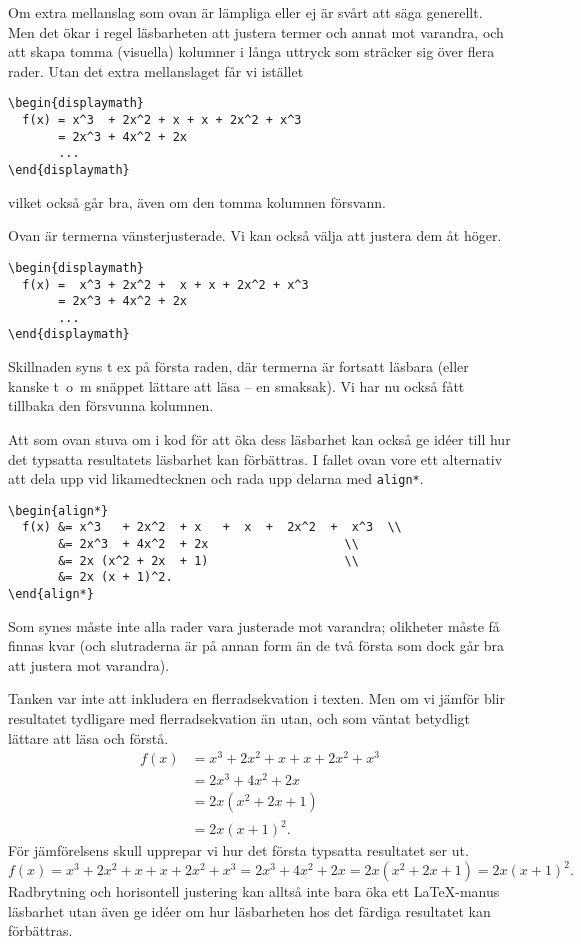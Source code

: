 \documentclass[a4paper,12pt]{article}
\begin{document}
Om extra mellanslag som ovan är lämpliga eller ej är svårt att säga
generellt. Men det ökar i regel läsbarheten att justera termer och
annat mot varandra, och att skapa tomma (visuella) 
kolumner i långa uttryck som sträcker sig över flera rader. Utan det
extra mellanslaget får vi istället 
%
\begin{lstlisting}
\begin{displaymath}
  f(x) = x^3  + 2x^2 + x + x + 2x^2 + x^3
       = 2x^3 + 4x^2 + 2x
       ...
\end{displaymath}
\end{lstlisting}
%
vilket också går bra, även om den tomma kolumnen försvann. 


Ovan är termerna vänsterjusterade. Vi kan också välja att justera dem
åt höger. 
\begin{lstlisting}
\begin{displaymath}
  f(x) =  x^3 + 2x^2 +  x + x + 2x^2 + x^3
       = 2x^3 + 4x^2 + 2x
       ...
\end{displaymath}
\end{lstlisting}
%
Skillnaden syns t ex på första raden, där termerna är fortsatt läsbara
(eller kanske t~o~m snäppet lättare att läsa -- en smaksak). Vi har nu
också fått tillbaka den försvunna kolumnen.


Att som ovan stuva om i kod för att öka dess läsbarhet kan också ge
idéer till hur det typsatta resultatets läsbarhet kan förbättras. I
fallet ovan vore ett alternativ att dela upp vid likamedtecknen och
rada upp delarna med \texttt{align*}. 
%
\begin{lstlisting}
\begin{align*}
  f(x) &= x^3   + 2x^2  + x   +  x  +  2x^2  +  x^3  \\
       &= 2x^3  + 4x^2  + 2x                   \\
       &= 2x (x^2 + 2x  + 1)                   \\
       &= 2x (x + 1)^2.
\end{align*}
\end{lstlisting}
%
Som synes måste inte alla rader vara justerade mot varandra; olikheter
måste få finnas kvar (och slutraderna är på annan form än de två
första som dock går bra att justera mot varandra).

Tanken var inte att inkludera en flerradsekvation i texten. Men om vi
jämför blir resultatet tydligare med flerradsekvation än utan, och som
väntat betydligt lättare att läsa och förstå.
%
\begin{align*}
  f(x) &= x^3  + 2x^2 + x + x + 2x^2 + x^3 \\
       &= 2x^3 + 4x^2 + 2x \\
       &= 2x(x^2 + 2x + 1) \\
       &= 2x(x + 1)^2. 
\end{align*}
%
För jämförelsens skull upprepar vi hur det första typsatta resultatet
ser ut. 
\begin{displaymath}
  f(x)=x^3+2x^2+x+x+2x^2+x^3
  =2x^3+4x^2+2x=2x(x^2+2x+1)=2x(x+1)^2.
\end{displaymath}
%
Radbrytning och horisontell justering kan alltså inte bara öka ett
\LaTeX-manus läsbarhet utan även ge idéer om hur läsbarheten hos det
färdiga resultatet kan förbättras. 
\end{document}
